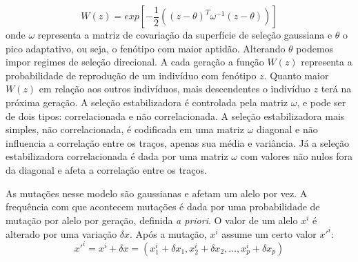 \documentclass[a4paper, 12pt, titlepage, onecolumn]{article}
\numberwithin{equation}{section}
\numberwithin{table}{section}
\begin{document}
\begin{equation}
W(z) = exp \left[-\frac{1}{2} ((z-\theta)^T \omega^{-1} (z-\theta))\right] 
\label{selecao}
\end{equation}
onde $\omega$ representa a matriz de covariação da superfície de seleção
gaussiana e $\theta$ o pico adaptativo, ou seja, o fenótipo com maior
aptidão. Alterando $\theta$ podemos impor regimes de seleção direcional.
A cada geração a função $W(z)$ representa a probabilidade de reprodução
de um indivíduo com fenótipo $z$. Quanto maior $W(z)$ em relação aos
outros indivíduos, mais descendentes o indivíduo $z$ terá na próxima
geração. A seleção estabilizadora é controlada pela matriz $\omega$, e
pode ser de dois tipos: correlacionada e não correlacionada. A seleção
estabilizadora mais simples, não correlacionada, é codificada em uma
matriz $\omega$ diagonal e não influencia a correlação entre os traços,
apenas sua média e variância. Já a seleção estabilizadora correlacionada
é dada por uma matriz $\omega$ com valores não nulos fora da diagonal e
afeta a correlação entre os traços. 

As mutações nesse modelo são gaussianas e afetam um alelo por vez.  A
frequência com que acontecem mutações é dada por uma probabilidade de
mutação por alelo por geração, definida {\it a priori}. O valor de um alelo
$x^i$ é alterado por uma variação $ \delta x$. Após a mutação, $x^i$
assume um certo valor $x'^i$:
\begin{equation}
x'^i = x^i + \delta x = ( x^i_1 + \delta x_1, x^i_2 + \delta x_2,\ldots, x^i_p + \delta x_p)
\end{equation}
\end{document}
